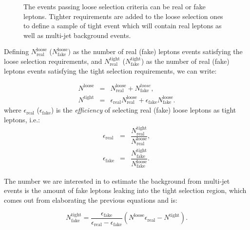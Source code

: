 \begin{figure}[htb]\begin{center}
	\caption{The events passing loose selection criteria can be real or fake leptons.
        Tighter requirements are added to the loose selection ones to define a sample of
        tight event which will contain real leptons as well as multi-jet background events.}
\end{center}\end{figure}

Defining $N^\mathrm{loose}_\mathrm{real}$ ($N^\mathrm{loose}_\mathrm{fake}$) as the number of
real (fake) leptons events satisfying the loose selection requirements, and
$N^\mathrm{tight}_\mathrm{real}$ ($N^\mathrm{tight}_\mathrm{fake}$) as the number of
real (fake) leptons events satisfying the tight selection requirements, we can write:

\begin{eqnarray}
\label{eqn:intro-mm-Nloose}
N^\mathrm{loose} & = & N^\mathrm{loose}_\mathrm{real} + N^{loose}_\mathrm{fake}, \\
\label{eqn:intro-mm-Ntight}
N^\mathrm{tight} & = & \epsilon_\mathrm{real}N^\mathrm{loose}_\mathrm{real} + \epsilon_\mathrm{fake}N^\mathrm{loose}_\mathrm{fake}.
\end{eqnarray}
where $\epsilon_\mathrm{real}$ ($\epsilon_\mathrm{fake}$) is the 
{\it efficiency} of selecting real (fake) loose leptons as tight leptons, i.e.:
\begin{eqnarray}
\label{eqn:intro-mm-real}
\epsilon_\mathrm{real} & = & \dfrac{N^\mathrm{tight}_\mathrm{real}}{N^\mathrm{loose}_\mathrm{real}}, \\
\label{eqn:intro-mm-fake}
\epsilon_\mathrm{fake} & = & \dfrac{N^\mathrm{tight}_\mathrm{fake}}{N^\mathrm{loose}_\mathrm{fake}}.
\end{eqnarray}


The number we are interested in to estimate the background from
multi-jet events is the amount of fake leptons leaking into the 
tight selection region, which comes out from elaborating
the previous equations and is:

\begin{equation}
N^\mathrm{tight}_\mathrm{fake} = \frac{\epsilon_\mathrm{fake}}{\epsilon_\mathrm{real} - \epsilon_\mathrm{fake}}(N^\mathrm{loose} \epsilon_\mathrm{real} - N^\mathrm{tight}).
\label{eqn:intro-mm-tight_fake}
\end{equation}

